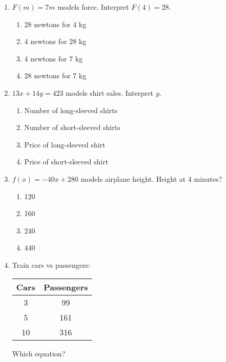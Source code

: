 \documentclass[12pt]{exam}
\begin{document}
\begin{enumerate}
\begin{center}
\end{center}
    \item $F(m) = 7m$ models force. Interpret $F(4) = 28$.
    \begin{enumerate}[label=\Alph*)]
        \item 28 newtons for 4 kg
        \item 4 newtons for 28 kg
        \item 4 newtons for 7 kg
        \item 28 newtons for 7 kg
    \end{enumerate}
    \item $13x + 14y = 423$ models shirt sales. Interpret $y$.
    \begin{enumerate}[label=\Alph*)]
        \item Number of long-sleeved shirts
        \item Number of short-sleeved shirts
        \item Price of long-sleeved shirt
        \item Price of short-sleeved shirt
    \end{enumerate}
    \item $f(x) = -40x + 280$ models airplane height. Height at 4 minutes?
    \begin{enumerate}[label=\Alph*)]
        \item 120
        \item 160
        \item 240
        \item 440
    \end{enumerate}
    \item Train cars vs passengers:
    \begin{center}
        \begin{tabular}{|c|c|}
            \hline
            Cars & Passengers \\
            \hline
            3 & 99 \\
            5 & 161 \\
            10 & 316 \\
            \hline
        \end{tabular}
    \end{center}
    Which equation?
    \begin{enumerate}[label=\Alph*)]

\end{enumerate}
\end{enumerate}
\end{document}
